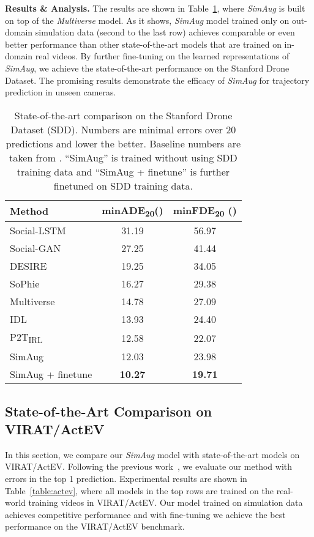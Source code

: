 \documentclass[runningheads]{eccv2020/llncs}
\newcommand{\fancyname}{SimAug}
\begin{document}
\noindent\textbf{Results \& Analysis.} The results are shown in Table~\ref{table:sdd}, where \textit{\fancyname} is built on top of the \textit{Multiverse} model. 
As it shows, \textit{\fancyname} model trained only on out-domain simulation data (second to the last row) achieves comparable or even better performance than other state-of-the-art models that are trained on in-domain real videos. By further fine-tuning on the learned representations of \textit{\fancyname}, we achieve the state-of-the-art performance on the Stanford Drone Dataset. 
The promising results demonstrate the efficacy of \textit{\fancyname} for trajectory prediction in unseen cameras.

\begin{table}[]
\vspace{-4mm}
\centering
\caption{State-of-the-art comparison on the Stanford Drone Dataset (SDD). Numbers are minimal errors over 20 predictions and lower the better. Baseline numbers are taken from \cite{sadeghian2018sophie,deo2020trajectory}. ``SimAug'' is trained without using SDD training data and ``SimAug + finetune'' is further finetuned on SDD training data.}
\begin{tabular}{lcc}
\toprule
Method & minADE\textsubscript{20}()   & minFDE\textsubscript{20} ()      \\
\midrule
Social-LSTM~\cite{alahi2016social} & 31.19 & 56.97 \\
Social-GAN~\cite{gupta2018social} & 27.25   &  41.44 \\ 
DESIRE~\cite{lee2017desire} &  19.25 & 34.05 \\ 
SoPhie~\cite{sadeghian2018sophie} &  16.27 & 29.38 \\ 
Multiverse~\cite{liang2020garden} & 14.78 & 27.09 \\
IDL~\cite{li2019way} &  13.93 & 24.40 \\ 
P2T\textsubscript{IRL}~\cite{deo2020trajectory} &  12.58 & 22.07 \\ 
\midrule
SimAug & 12.03  & 23.98 \\
SimAug + finetune & \textbf{10.27}  & \textbf{19.71} \\
\bottomrule
\end{tabular}
\label{table:sdd}
\vspace{-8mm}
\end{table} 
\subsection{State-of-the-Art Comparison on VIRAT/ActEV}
\label{sec:exp_actev}
In this section, we compare our \textit{\fancyname} model with state-of-the-art models on VIRAT/ActEV.
Following the previous work~\cite{liang2020garden}, we evaluate our method with errors in the top 1 prediction. 
Experimental results are shown in Table~\ref{table:actev}, where all models in the top rows are trained on the real-world training videos in VIRAT/ActEV. Our model trained on simulation data achieves competitive performance and with fine-tuning we achieve the best performance on the VIRAT/ActEV benchmark.
\end{document}
